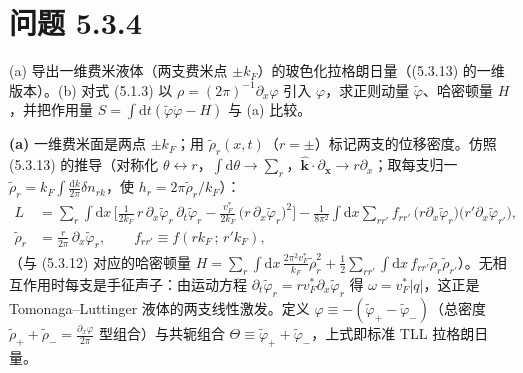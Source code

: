 \section*{问题 5.3.4}
\begin{problem}
(a) 导出一维费米液体（两支费米点 $\pm k_F$）的玻色化拉格朗日量（(5.3.13) 的一维版本）。(b) 对式 (5.1.3) 以 $\rho=(2\pi)^{-1}\partial_x\varphi$ 引入 $\varphi$，求正则动量 $\tilde\varphi$、哈密顿量 $H$，并把作用量 $S=\int\mathrm{d}t(\tilde\varphi\dot\varphi-H)$ 与 (a) 比较。
\end{problem}
\solution

\textbf{(a)} 一维费米面是两点 $\pm k_F$；用 $\tilde\rho_r(x,t)$（$r=\pm$）标记两支的位移密度。仿照 (5.3.13) 的推导（对称化 $\theta\leftrightarrow r$，$\int\mathrm{d}\theta\to\sum_{r}$，$\hat{\pmb{k}}\cdot\partial_{\pmb{x}}\to r\partial_x$；取每支归一 $\tilde\rho_r=k_F\!\int\frac{\mathrm{d}k}{2\pi}\delta n_{rk}$，使 $h_r=2\pi\tilde\rho_r/k_F$）：
\begin{align*}
L&=\sum_{r}\int\mathrm{d}x\,\Big[\frac{1}{2k_F}\,r\,\partial_x\tilde\varphi_r\,\partial_t\tilde\varphi_r
-\frac{v_F^{*}}{2k_F}\,\big(r\,\partial_x\tilde\varphi_r\big)^{2}\Big]
-\frac{1}{8\pi^{2}}\int\mathrm{d}x\sum_{rr'}f_{rr'}\,\big(r\partial_x\tilde\varphi_r\big)\big(r'\partial_x\tilde\varphi_{r'}\big),\\
\tilde\rho_r&=\frac{r}{2\pi}\,\partial_x\tilde\varphi_r,\qquad
f_{rr'}\equiv f(rk_F\,;\,r'k_F),
\end{align*}
（与 (5.3.12) 对应的哈密顿量 $H=\sum_r\int\mathrm{d}x\,\frac{2\pi^{2}v_F^{*}}{k_F}\tilde\rho_r^{2}+\frac12\sum_{rr'}\int\mathrm{d}x\,f_{rr'}\tilde\rho_r\tilde\rho_{r'}$）。无相互作用时每支是手征声子：由运动方程 $\partial_t\tilde\varphi_r=rv_F^{*}\partial_x\tilde\varphi_r$ 得 $\omega=v_F^{*}|q|$，这正是 Tomonaga--Luttinger 液体的两支线性激发。定义 $\varphi\equiv-(\tilde\varphi_{+}-\tilde\varphi_{-})$（总密度 $\tilde\rho_{+}+\tilde\rho_{-}=\frac{\partial_x\varphi}{2\pi}$ 型组合）与共轭组合 $\Theta\equiv\tilde\varphi_{+}+\tilde\varphi_{-}$，上式即标准 TLL 拉格朗日量。

